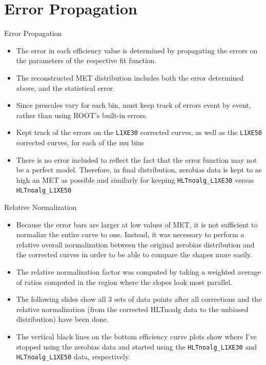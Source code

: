 \documentclass[]{beamer}
\begin{document}
\section{Error Propagation}
\begin{frame}{Error Propagation}
		\begin{itemize}
				\item The error in each efficiency value is determined by propagating the errors on the parameters of the respective fit function.
				\item The reconstructed MET distribution includes both the error determined above, and the statistical error. 
				\item Since prescales vary for each bin, must keep track of errors event by event, rather than using ROOT’s built-in errors. 
				\item Kept track of the errors on the \texttt{L1XE30} corrected curves, as well as the \texttt{L1XE50} corrected curves, for each of the mu bins
                \item There is no error included to reflect the fact that the error function may not be a perfect model. Therefore, in final distribution, zerobias data is kept to as high an MET as possible and similarly for keeping \texttt{HLTnoalg\_L1XE30} versus \texttt{HLTnoalg\_L1XE50}
        \end{itemize}
\end{frame}
\begin{frame}
\end{frame}
\begin{frame}
\end{frame}
\begin{frame}{Relative Normalization}
		\begin{itemize}
				\item Because the error bars are larger at low values of MET, it is not sufficient to normalize the entire curve to one. Instead, it was necessary to perform a relative overall normalization between the original zerobias distribution and the corrected curves in order to be able to compare the shapes more easily.
				\item The relative normalization factor was computed by taking a weighted average of ratios computed in the region where the slopes look most parallel.
                \item The following slides show all 3 sets of data points after all corrections and the relative normalization (from the corrected HLTnoalg data to the unbiased distribution) have been done.
                \item The vertical black lines on the bottom efficiency curve plots show where I've stopped using the zerobias data and started using the \texttt{HLTnoalg\_L1XE30} and \texttt{HLTnoalg\_L1XE50} data, respectively.
		\end{itemize}
\end{frame}
\end{document}
